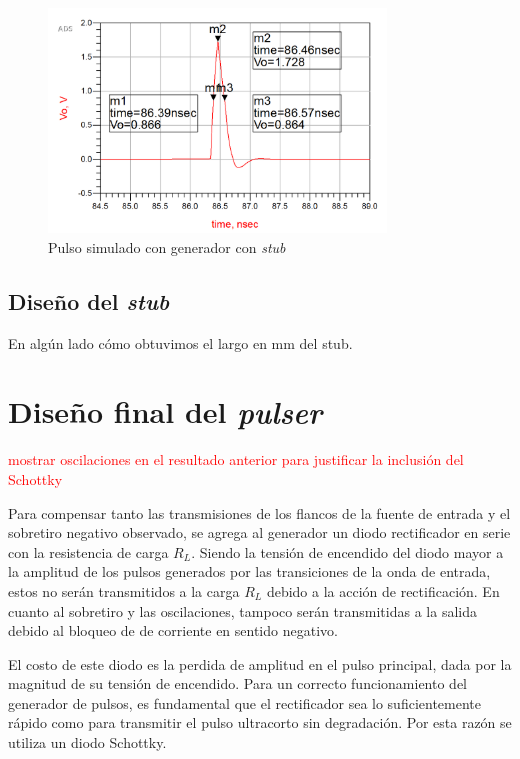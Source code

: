 \begin{figure}[tbp]
    \centering
    \includegraphics[width=0.8\textwidth]{images/stub_generator_result_pulse.png}
    \caption{Pulso simulado con generador con \textit{stub}}
    \label{fig:stub_generator_result_pulse}
\end{figure}

\subsection{Diseño del \textit{stub}}

En algún lado cómo obtuvimos el largo en mm del stub.

\section{Diseño final del \textit{pulser}}

\textcolor{red}{mostrar oscilaciones en el resultado anterior para justificar la
inclusión del Schottky}

Para compensar tanto las transmisiones de los flancos de la fuente de entrada y
el sobretiro negativo observado, se agrega al generador un diodo rectificador en
serie con la resistencia de carga $R_L$. Siendo la tensión de encendido del
diodo mayor a la amplitud de los pulsos generados por las transiciones de la
onda de entrada, estos no serán transmitidos a la carga $R_L$ debido a la acción
de rectificación. En cuanto al sobretiro y las oscilaciones, tampoco serán
transmitidas a la salida debido al bloqueo de de corriente en sentido negativo.

El costo de este diodo es la perdida de amplitud en el pulso principal, dada por la
magnitud de su tensión de encendido. Para un correcto funcionamiento del
generador de pulsos, es fundamental que el rectificador sea lo suficientemente
rápido como para transmitir el pulso ultracorto sin degradación. Por esta razón
se utiliza un diodo Schottky.

